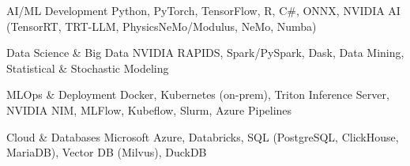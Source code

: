 
\begin{cvskills}

	\cvskill
	{AI/ML Development}
	{Python, PyTorch, TensorFlow, R, C\#, ONNX, NVIDIA AI (TensorRT, TRT-LLM, PhysicsNeMo/Modulus, NeMo, Numba)}

	\cvskill
	{Data Science \& Big Data}
	{NVIDIA RAPIDS, Spark/PySpark, Dask, Data Mining, Statistical \& Stochastic Modeling}

	\cvskill
	{MLOps \& Deployment}
	{Docker, Kubernetes (on-prem), Triton Inference Server, NVIDIA NIM, MLFlow, Kubeflow, Slurm, Azure Pipelines}

	\cvskill
	{Cloud \& Databases}
	{Microsoft Azure, Databricks, SQL (PostgreSQL, ClickHouse, MariaDB), Vector DB (Milvus), DuckDB}


\end{cvskills}